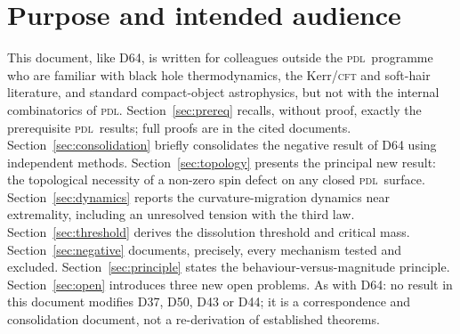 \documentclass[12pt,a4paper]{article}
\newcommand{\PDL}{\textsc{pdl}}
\begin{document}
\begin{abstract}
independent attempts to derive an absolute microstate count or a
Bardeen--Thorne-type spin-limiting mechanism from \PDL\ combinatorics
are reported as failures, each with its precise structural cause,
extending and reinforcing the negative result of D64 rather than
contradicting it. Fifth, these results are organised under a single
methodological principle: at the black hole scale, \PDL\ currently
supports claims about \emph{behaviour} (what is topologically
forced, what functional form a law must take, what threshold a
transition must respect) but not about \emph{magnitude} (absolute
entropy, absolute coupling strength), and this asymmetry is shown to
be structural rather than a temporary gap in derivation effort.
Three open problems are introduced.
\end{abstract}

\clearpage
\tableofcontents
\newpage

\section{Purpose and intended audience}
\label{sec:purpose}

This document, like D64, is written for colleagues outside the
\PDL\ programme who are familiar with black hole thermodynamics,
the Kerr/\textsc{cft} and soft-hair literature, and standard
compact-object astrophysics, but not with the internal
combinatorics of \PDL. Section~\ref{sec:prereq} recalls, without
proof, exactly the prerequisite \PDL\ results; full proofs are in
the cited documents. Section~\ref{sec:consolidation} briefly
consolidates the negative result of D64 using independent
methods. Section~\ref{sec:topology} presents the principal new
result: the topological necessity of a non-zero spin defect on any
closed \PDL\ surface. Section~\ref{sec:dynamics} reports the
curvature-migration dynamics near extremality, including an
unresolved tension with the third law. Section~\ref{sec:threshold}
derives the dissolution threshold and critical mass.
Section~\ref{sec:negative} documents, precisely, every mechanism
tested and excluded. Section~\ref{sec:principle} states the
behaviour-versus-magnitude principle. Section~\ref{sec:open}
introduces three new open problems. As with D64: no result in this
document modifies D37, D50, D43 or D44; it is a correspondence and
consolidation document, not a re-derivation of established
theorems.
\end{document}
